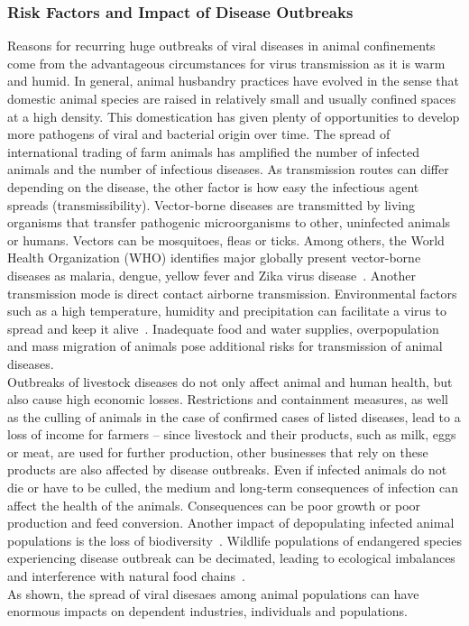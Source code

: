 \subsubsection*{Risk Factors and Impact of Disease Outbreaks}
Reasons for recurring huge outbreaks of viral diseases in animal confinements come from the advantageous circumstances for virus transmission as it is warm and humid. In general, animal husbandry practices have evolved in the sense that domestic animal species are raised in relatively small and usually confined spaces at a high density. This domestication has given plenty of opportunities to develop more pathogens of viral and bacterial origin over time. The spread of international trading of farm animals has amplified the number of infected animals and the number of infectious diseases. As transmission routes can differ depending on the disease, the other factor is how easy the infectious agent spreads (transmissibility). Vector-borne diseases are transmitted by living organisms that transfer pathogenic microorganisms to other, uninfected animals or humans. Vectors can be mosquitoes, fleas or ticks. Among others, the World Health Organization (WHO) identifies major globally present vector-borne diseases as malaria, dengue, yellow fever and Zika virus disease~\cite{world2017global}. Another transmission mode is direct contact airborne transmission. Environmental factors such as a high temperature, humidity and precipitation can facilitate a virus to spread and keep it alive~\cite{eccles2002explanation}. Inadequate food and water supplies, overpopulation and mass migration of animals pose additional risks for transmission of animal diseases. \\
Outbreaks of livestock diseases do not only affect animal and human health, but also cause high economic losses. Restrictions and containment measures, as well as the culling of animals in the case of confirmed cases of listed diseases, lead to a loss of income for farmers -- since livestock and their products, such as milk, eggs or meat, are used for further production, other businesses that rely on these products are also affected by disease outbreaks. Even if infected animals do not die or have to be culled, the medium and long-term consequences of infection can affect the health of the animals. Consequences can be poor growth or poor production and feed conversion. Another impact of depopulating infected animal populations is the loss of biodiversity~\cite{lacroix2014non, morand2020emerging}. Wildlife populations of endangered species experiencing disease outbreak can be decimated, leading to ecological imbalances and interference with natural food chains~\cite{reid2010global, civitello2015biodiversity, espinosa2020infectious}. \\
As shown, the spread of viral disesaes among animal populations can have enormous impacts on dependent industries, individuals and populations.

